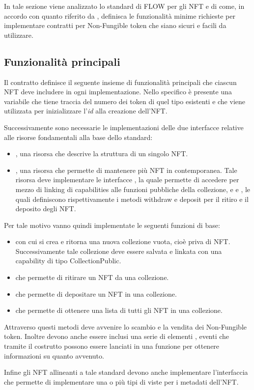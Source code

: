 In tale sezione viene analizzato lo standard di FLOW per gli NFT e di come, in accordo con quanto riferito da \cite{web:nft}, definisca le funzionalità minime richieste per implementare contratti per Non-Fungible token che siano sicuri e facili da utilizzare.

\subsection{Funzionalità principali}
Il contratto definisce il seguente insieme di funzionalità principali che ciascun NFT deve includere in ogni implementazione. Nello specifico è presente una variabile  che tiene traccia del numero dei token di quel tipo esistenti e che viene utilizzata per inizializzare l'\textit{id} alla creazione dell'NFT.

Successivamente sono necessarie le implementazioni delle due interfacce relative alle risorse fondamentali alla base dello standard:
\begin{itemize}
    \item {}, una risorsa che descrive la struttura di un singolo NFT.
    \item {}, una risorsa che permette di mantenere più NFT in contemporanea. Tale risorsa deve implementare le interfacce , la quale permette di accedere per mezzo di linking di capabilities alle funzioni pubbliche della collezione, e 
     e , le quali definiscono rispettivamente i metodi withdraw e deposit per il ritiro e il deposito degli NFT.
\end{itemize}

Per tale motivo vanno quindi implementate le seguenti funzioni di base:
\begin{itemize}
    \item {} con cui si crea e ritorna una nuova collezione vuota, cioè priva di NFT. Successivamente tale collezione deve essere salvata e linkata con una capability di tipo CollectionPublic.
    \item {} che permette di ritirare un NFT da una collezione.
    \item {} che permette di depositare un NFT in una collezione.
    \item {} che permette di ottenere una lista di tutti gli NFT in una collezione.
\end{itemize}
Attraverso questi metodi deve avvenire lo scambio e la vendita dei Non-Fungible token. Inoltre devono anche essere inclusi una serie di elementi , eventi che tramite il costrutto  possono essere lanciati in una funzione per ottenere informazioni su quanto avvenuto.

Infine gli NFT allineanti a tale standard devono anche implementare l'interfaccia   che permette di implementare una o più tipi di viste per i metadati dell'NFT.